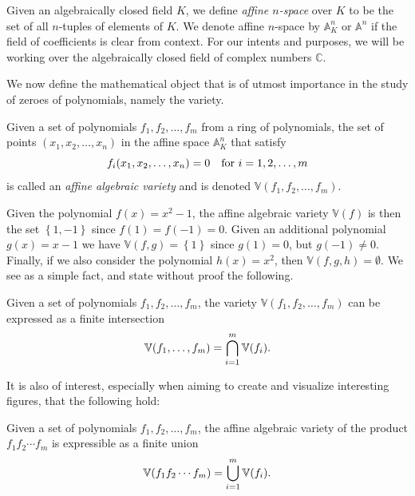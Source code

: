 \documentclass{article}
\newcommand{\C}{\ensuremath{\mathbb{C}}}
\newcommand{\A}{\ensuremath{\mathbb{A}}}
\newcommand{\V}{\ensuremath{\mathbb{V}}}
\begin{document}
    Given an algebraically closed field $K$, we define \emph{affine
    $n$-space} over $K$ to be the set of all $n$-tuples
    of elements of $K$. We denote affine $n$-space by $\A_K^n$ or $\A^n$ if the
    field of coefficients is clear from context.  For our intents and purposes,
    we will be working over the algebraically closed field of complex numbers
    $\C$. 
    
    We now define the mathematical object that is of utmost importance in the
    study of zeroes of polynomials, namely the variety.
    \begin{definition}
        Given a set of polynomials $f_1, f_2, \ldots, f_m$ from a ring of
        polynomials, the set of points $(x_1, x_2, \ldots, x_n)$ in the affine
        space $\A_K^n$ that satisfy
        \begin{equation}
            \notag
            f_i(x_1, x_2, \ldots, x_n) = 0 \quad \text{for } i = 1, 2, \ldots, m
        \end{equation}
        is called an \emph{affine algebraic variety} and is denoted $\V(f_1,
        f_2, \ldots, f_m)$.
    \end{definition}

    Given the polynomial $f(x) = x^2 - 1$, the affine algebraic variety $\V(f)$
    is then the set $\left\{ 1, -1 \right\}$ since $f(1) = f(-1) = 0$. Given an
    additional polynomial $g(x) = x-1$ we have $\V(f, g) = \left\{ 1 \right\}$
    since $g(1) = 0$, but $g(-1) \neq 0$. Finally, if we also consider the
    polynomial $h(x) = x^2$, then $\V(f, g, h) = \emptyset$. We see as a simple
    fact, and state without proof the following.
    
    \begin{corollary}
        Given a set of polynomials $f_1, f_2, \ldots, f_m$, the variety
        $\V(f_1, f_2, \ldots, f_m)$ can be expressed as a finite intersection
        \begin{equation}
            \notag
            \V(f_1, \ldots, f_m) = \bigcap_{i=1}^{m} \V(f_i).
        \end{equation}
    \end{corollary}
    It is also of interest, especially when aiming to create and visualize
    interesting figures, that the following hold:
    \begin{corollary}
    Given a set of polynomials $f_1, f_2, \ldots, f_m$, the affine algebraic
    variety of the product $f_1f_2\cdots f_m$ is expressible as a finite union
    \begin{equation}
        \notag
        \V(f_1f_2\cdots f_m) = \bigcup_{i=1}^{m} \V(f_i).
    \end{equation}
    \end{corollary}
    
\end{document}
